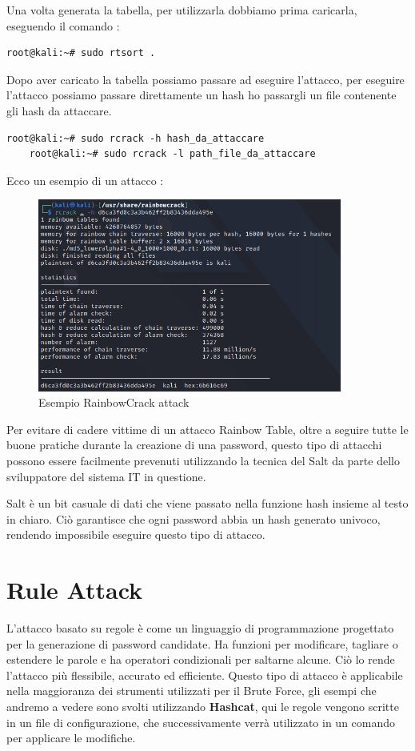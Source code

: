 Una volta generata la tabella, per utilizzarla dobbiamo prima caricarla, eseguendo il comando : 

\begin{lstlisting}[caption={RainbowCrack caricamento tabelle}, style=javaScriptCode]
    root@kali:~# sudo rtsort .
    \end{lstlisting}

Dopo aver caricato la tabella possiamo passare ad eseguire l'attacco, per eseguire l'attacco possiamo passare direttamente un hash ho passargli un file contenente gli hash da attaccare.

\begin{lstlisting}[caption={Esempio RainbowCrack command attack}, style=javaScriptCode]
    root@kali:~# sudo rcrack -h hash_da_attaccare
    root@kali:~# sudo rcrack -l path_file_da_attaccare
    \end{lstlisting}
\newpage
Ecco un esempio di un attacco :

\begin{figure}[h!]
    \centering
    \includegraphics[width=100mm]{Immagini/1/r_2.png}
    \caption{Esempio RainbowCrack attack}
\end{figure}

Per evitare di cadere vittime di un attacco Rainbow Table, oltre a seguire tutte le buone pratiche durante la creazione di una password, questo tipo di attacchi possono essere facilmente prevenuti utilizzando la tecnica del Salt da parte dello sviluppatore del sistema IT in questione. 

Salt è un bit casuale di dati che viene passato nella funzione hash insieme al testo in chiaro. Ciò garantisce che ogni password abbia un hash generato univoco, rendendo impossibile eseguire questo tipo di attacco.

\section{Rule Attack}
L'attacco basato su regole\cite{Rule_based} è come un linguaggio di programmazione progettato per la generazione di password candidate. Ha funzioni per modificare, tagliare o estendere le parole e ha operatori condizionali per saltarne alcune. Ciò lo rende l'attacco più flessibile, accurato ed efficiente.
Questo tipo di attacco è applicabile nella maggioranza dei strumenti utilizzati per il Brute Force, gli esempi che andremo a vedere sono svolti utilizzando \textbf{Hashcat}, qui le regole vengono scritte in un file di configurazione, che successivamente verrà utilizzato in un comando per applicare le modifiche.

